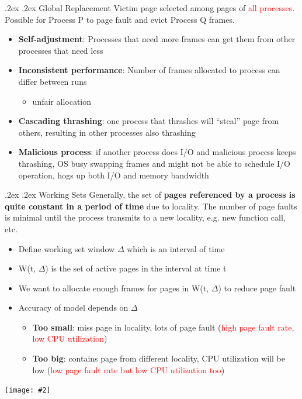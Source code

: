 \documentclass[13pt,landscape,a4paper]{article}
\makeatletter
\newcommand\ctrimg[2][0.8]{\begin{center}\texttt{[image: \#2]} \end{center}}
\newcommand\red[1]{\textcolor{red}{#1}}
\renewcommand{\subsection}{\@startsection{subsection}{1}{0mm}%
    {.2ex}%
    {.2ex}%
    {\sffamily\bfseries}}
\renewcommand{\subsubsection}{\@startsection{subsubsection}{1}{0mm}%
    {.2ex}%
    {.2ex}%
    {\rmfamily\bfseries}}
\makeatother
\begin{document}
\begin{multicols*}{3}
        \subsubsection{Global Replacement}
        Victim page selected among pages of \red{all processes}. Possible for Process P to page fault and evict Process Q frames.
        \begin{itemize}
            \item \textbf{Self-adjustment}: Processes that need more frames can get them from other processes that need less
            \item \textbf{Inconsistent performance}: Number of frames allocated to process can differ between runs
            \begin{itemize}
                \item unfair allocation
            \end{itemize}
            \item \textbf{Cascading thrashing}: one process that thrashes will “steal” page from others, resulting in other processes also thrashing
            \item \textbf{Malicious process}: if another process does I/O and malicious process keeps thrashing, OS busy swapping frames and might not be able to schedule I/O operation, hogs up both I/O and memory bandwidth
        \end{itemize}
        \subsection{Working Sets}
        Generally, the set of \textbf{pages referenced by a process is quite constant in a period of time} due to locality. The number of page faults is minimal until the process transmits to a new locality, e.g. new function call, etc.
        \begin{itemize}
            \item Define working set window $\Delta$ which is an interval of time
            \item W(t, $\Delta$) is the set of active pages in the interval at time t
            \item We want to allocate enough frames for pages in W(t, $\Delta$) to reduce page fault
            \item Accuracy of model depends on $\Delta$
            \begin{itemize}
                \item \textbf{Too small}: miss page in locality, lots of page fault (\red{high page fault rate, low CPU utilization})
                \item \textbf{Too big}: contains page from different locality, CPU utilization will be low (\red{low page fault rate but low CPU utilization too})
            \end{itemize}
        \end{itemize}
        \ctrimg[0.5]{working_set}

\end{multicols*}
\end{document}
